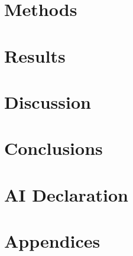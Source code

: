 \documentclass[a4paper, 12pt, openany, oneside]{book} %
\begin{document}
\chapter{Methods}




\chapter{Results}




\chapter{Discussion}
\label{chap:discussion}




\chapter{Conclusions}




\chapter*{AI Declaration}


\printbibliography[title={References}] %



\chapter*{\LARGE \textbf{Appendices}}
\fancyhf{} %
\renewcommand{\headrulewidth}{0pt} %
\fancyfoot[C]{\thepage} %

\appendix

\end{document}
